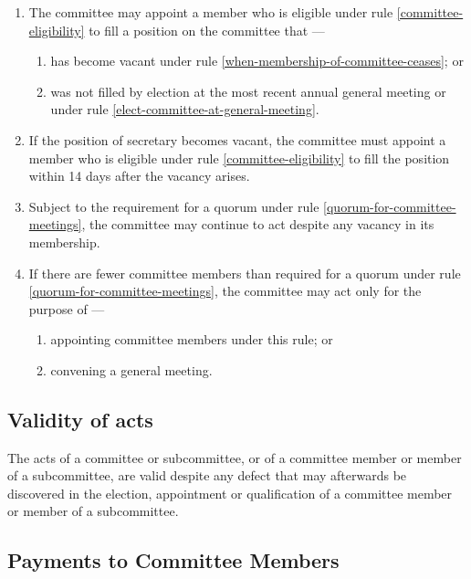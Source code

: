\documentclass[../constitution.tex]{subfiles}
\begin{document}
\begin{enumerate}

\item The committee may appoint a member who is eligible under rule \ref{committee-eligibility} to fill a position on the committee that ---

  \begin{enumerate}
  
  \item has become vacant under rule \ref{when-membership-of-committee-ceases}; or
  \item was not filled by election at the most recent annual general meeting or under rule \ref{elect-committee-at-general-meeting}.
  \end{enumerate}
\item If the position of secretary becomes vacant, the committee must appoint a member who is eligible under rule \ref{committee-eligibility} to fill the position within 14 days after the vacancy arises.
\item Subject to the requirement for a quorum under rule \ref{quorum-for-committee-meetings}, the committee may continue to act despite any vacancy in its membership.
\item If there are fewer committee members than required for a quorum under rule \ref{quorum-for-committee-meetings}, the committee may act only for the purpose of --- \label{committee-doesnt-meet-quorum}

  \begin{enumerate}
    \item appointing committee members under this rule; or
    \item convening a general meeting.
  \end{enumerate}
\end{enumerate}

\hypertarget{validity-of-acts}{%
\subsection{Validity of acts}\label{validity-of-acts}}

The acts of a committee or subcommittee, or of a committee member or member of a subcommittee, are valid despite any defect that may afterwards be discovered in the election, appointment or qualification of a committee member or member of a subcommittee.

\hypertarget{payments-to-committee-members}{%
\subsection{Payments to Committee Members}\label{payments-to-committee-members}}
\end{document}
